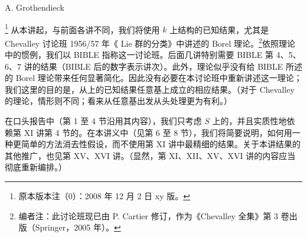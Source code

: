 \begin{center}A. Grothendieck\end{center}
\footnote[0]{原本版本注（0）：2008 年 12 月 2 日 xy 版。}
从本讲起，与前面各讲不同，我们将使用 $k$ 上结构的已知结果，尤其是 Chevalley 讨论班 1956/57 年《 Lie 群的分类》中讲述的 Borel 理论。\footnote[1]{编者注：此讨论班现已由 P. Cartier 修订，作为《Chevalley 全集》第 3 卷出版（Springer，2005 年）。}依照理论中的惯例，我们以 BIBLE 指称这一讨论班。后面几讲特别需要 BIBLE 第 4、5、6、7 讲的结果（BIBLE 后的数字表示讲次）。此外，理论似乎没有给 BIBLE 所述的 Borel 理论带来任何显著简化。因此没有必要在本讨论班中重新讲述这一理论；我们这里的目的是，从上的已知结果任意基上成立的相应结果。（对于 Chevalley 的理论，情形则不同；看来从任意基出发从头处理更为有利。）

在口头报告中（第 1 至 4 节沿用其内容），我们只考虑 $S$ 上的，并且实质性地依赖第 XI 讲第 4 节的。在本讲义中（见第 6 至 8 节），我们将简要说明，如何用一种更简单的方法消去性假设，而不使用第 XI 讲中最精细的结果。关于本讲结果的其他推广，也见第 XV、XVI 讲。（显然，第 XI、XII、XV、XVI 讲的内容应当彻底重新编排。）

